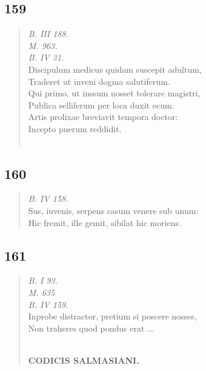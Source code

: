 \documentclass[11pt, a4paper]{report}
\begin{document}
            \subsection*{159}
      \begin{verse}
      \textit{B. III 188.} \\ \textit{M. 963.} \\ \textit{B. IV 31.} \\ Discipulum medicus quidam suscepit adultum, \\ Traderet ut inveni dogma salutiferum. \\ Qui primo, ut inssum nosset tolerare magistri, \\ Publica selliferum per loca duxit ecum. \\ Artis prolixae breviavit tempora doctor: \\ Incepto puerum reddidit. \\ 
        ﻿\pagebreak 
     \marginpar{[160]} 
      \end{verse}
  
            \subsection*{160}
      \begin{verse}
      \textit{B. IV 158.} \\ Sus, iuvenis, serpens casum venere sub unum: \\ Hic fremit, ille gemit, sibilat hic moriens. \\ 
      \end{verse}
  
            \subsection*{161}
      \begin{verse}
      \textit{B. I 93.} \\ \textit{M. 635} \\ \textit{B. IV 159.} \\ Inprobe distractor, pretium si poscere nosses, \\ Non traheres quod pondus erat  \lbrack ... \rbrack  \\ 
        ﻿\pagebreak 
    \begin{center} \textbf{CODICIS SALMASIANI.} \end{center} \marginpar{[149]} 
      \end{verse}
  
\end{document}
